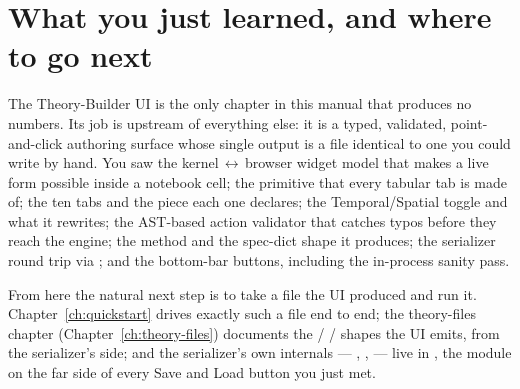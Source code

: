 \section{What you just learned, and where to go next}

The Theory-Builder UI is the only chapter in this manual that produces no numbers.
Its job is upstream of everything else: it is a typed, validated, point-and-click
authoring surface whose single output is a  file identical to one
you could write by hand. You saw the kernel\,$\leftrightarrow$\,browser widget
model that makes a live form possible inside a notebook cell; the
 primitive that every tabular tab is made of; the ten tabs and
the \msrjd{} piece each one declares; the Temporal/Spatial toggle and what it
rewrites; the AST-based action validator that catches typos before they reach the
engine; the  method and the spec-dict shape it produces; the
serializer round trip via ; and the bottom-bar buttons,
including the in-process  sanity pass.

From here the natural next step is to take a file the UI produced and run it.
Chapter~\ref{ch:quickstart} drives exactly such a file end to end; the theory-files
chapter (Chapter~\ref{ch:theory-files}) documents the  /
 /  shapes the UI emits, from the
serializer's side; and the serializer's own internals --- ,
,  --- live in
, the module on the far side of every Save and
Load button you just met.
